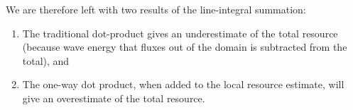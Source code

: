 We are therefore left with two results of the line-integral summation:
\begin{enumerate}
\item The traditional dot-product gives an underestimate of the total resource (because wave energy that fluxes out of the domain is subtracted from the total), and
\item The one-way dot product, when added to the local resource estimate, will give an overestimate of the total resource.
\end{enumerate}
